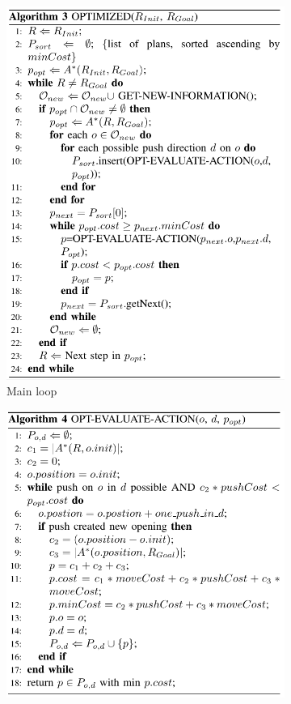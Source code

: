 \begin{figure}[H]
\centering
\begin{subfigure}{.5\textwidth}
  \centering
  \includegraphics[width=\linewidth]{Figures/Wu_Original_Algorithm/algo3.png}
  \caption{Main loop}
  \label{fig:Wu_Original_Algorithm-algo3}
\end{subfigure}%
\begin{subfigure}{.5\textwidth}
  \centering
  \includegraphics[width=\linewidth]{Figures/Wu_Original_Algorithm/algo4.png}

\end{subfigure}
\end{figure}
